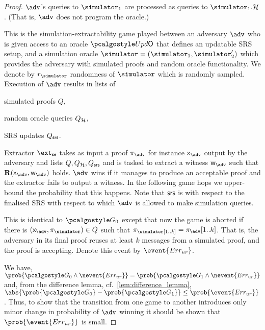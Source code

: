 \begin{proof}
	 $\advse$'s queries to $\simulator_1$ are processed as queries to $\simulator_1.\ro$. (That is, $\advse$ does not program the oracle.)


	 This is the simulation-extractability game played between an adversary
	$\advse$ who is given access to an oracle $\initU$ that defines an updatable SRS
	setup, and a simulation oracle $\simulator = (\simulator_1, \simulator_2')$ which provides the adversary with simulated
	proofs and random oracle functionality. We denote by $\rsim$
	randomness of $\simulator$ which is randomly sampled. Execution of $\advse$ results in
	lists of
	\begin{inparaenum}[(1)]
		\item simulated proofs $Q$,
		\item random oracle queries $Q_{\mathcal{H}}$,
		\item SRS updates $Q_{\mathsf{srs}}$.
	\end{inparaenum}
	Extractor $\extse$ takes as input a proof $\zkproof_{\advse}$ for instance
	$\inp_{\advse}$ output by the adversary and lists $Q, Q_{\mathcal{H}}, Q_{\mathsf{srs}}$ and is tasked
	to extract a witness $\wit_{\advse}$ such that $\REL(\inp_{\advse}, \wit_{\advse})$
	holds. $\advse$ wins if it manages to produce an acceptable proof and the extractor
	fails to output a witness. In the following game hops we upper-bound the
	probability that this happens. Note that $\mathsf{srs}$ is with respect to the finalised
	SRS with respect to which $\adv$ is allowed to make simulation queries.
	
	 This is identical to $\game{0}$ except that now the game is aborted if
	there is $(\inp_\advse, \zkproof_{\simulator}) \in Q$ such that
	$\zkproof_\simulator[1..k] = \zkproof_{\advse}[1..k]$. That is, the adversary in
	its final proof reuses at least $k$ messages from a simulated proof, and the proof
	is accepting.  Denote this event by $\event{\errur}$.

	 We have,
	\( \prob{\game{0} \land \nevent{\errur}} = \prob{\game{1} \land \nevent{\errur}} \)
	and, from the difference lemma, cf.~\cref{lem:difference_lemma},
	$ \abs{\prob{\game{0}} - \prob{\game{1}}} \leq \prob{\event{\errur}}\,$.  Thus, to
	show that the transition from one game to another introduces only minor change in
	probability of $\adv$ winning it should be shown that $\prob{\event{\errur}}$ is
	small.
	

\end{proof}
